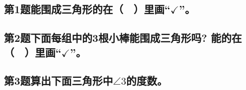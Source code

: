 \subsection*{第1题\quad 能围成三角形的在（　）里画“$\checkmark$”。}
\subsection*{第2题\quad 下面每组中的3根小棒能围成三角形吗? 能的在（　）里画“$\checkmark$”。}
\subsection*{第3题\quad 算出下面三角形中$\angle3$的度数。}
